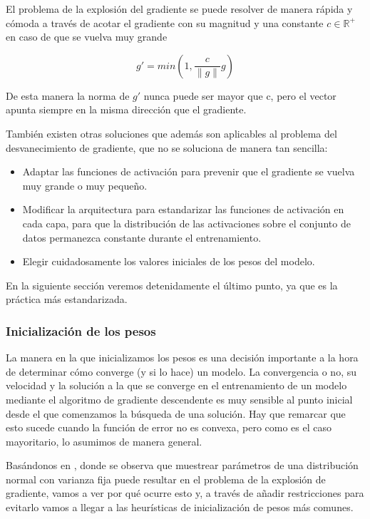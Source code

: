 El problema de la explosión del gradiente se puede resolver de manera rápida y cómoda a través de acotar el gradiente con su magnitud y una constante $c \in \mathbb{R}^+$ en caso de que se vuelva muy grande

$$g' = min(1, \frac{c}{\|g\|}g)$$

De esta manera la norma de $g'$ nunca puede ser mayor que c, pero el vector apunta siempre en la misma dirección que el gradiente.

También existen otras soluciones que además son aplicables al problema del desvanecimiento de gradiente, que no se soluciona de manera tan sencilla:

\begin{itemize}
    \item Adaptar las funciones de activación para prevenir que el gradiente se vuelva muy grande o muy pequeño.

    \item Modificar la arquitectura para estandarizar las funciones de activación en cada capa, para que la distribución de las activaciones sobre el conjunto de datos permanezca constante durante el entrenamiento.

    \item Elegir cuidadosamente los valores iniciales de los pesos del modelo.
   
\end{itemize}

En la siguiente sección veremos detenidamente el último punto, ya que es la práctica más estandarizada. 


\subsubsection{Inicialización de los pesos}

La manera en la que inicializamos los pesos es una decisión importante a la hora de determinar cómo converge (y si lo hace) un modelo. La convergencia o no, su velocidad y la solución a la que se converge en el entrenamiento de un modelo mediante el algoritmo de gradiente descendente es muy sensible al punto inicial desde el que comenzamos la búsqueda de una solución. Hay que remarcar que esto sucede cuando la función de error no es convexa, pero como es el caso mayoritario, lo asumimos de manera general.  

Basándonos en \cite{stabilityProblem2}, donde se observa que muestrear parámetros de una distribución normal con varianza fija puede resultar en el problema de la explosión de gradiente, vamos a ver por qué ocurre esto y, a través de añadir restricciones para evitarlo vamos a llegar a las heurísticas de inicialización de pesos más comunes.

